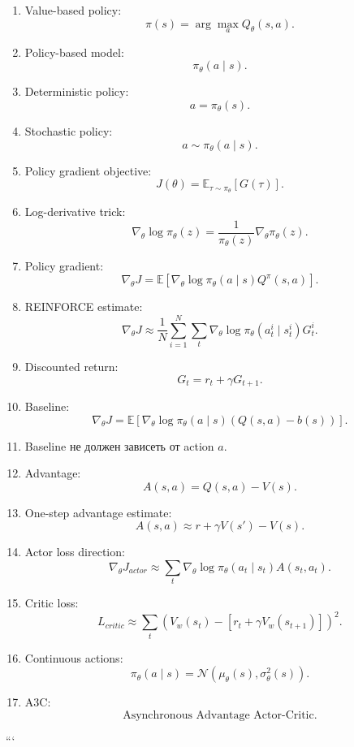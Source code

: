 \documentclass[a4paper,12pt]{article}
\begin{document}
\begin{enumerate}
    \item Value-based policy:
    \[
    \pi(s)=\arg\max_a Q_\theta(s,a).
    \]

    \item Policy-based model:
    \[
    \pi_\theta(a\mid s).
    \]

    \item Deterministic policy:
    \[
    a=\pi_\theta(s).
    \]

    \item Stochastic policy:
    \[
    a\sim\pi_\theta(a\mid s).
    \]

    \item Policy gradient objective:
    \[
    J(\theta)
    =
    \mathbb{E}_{\tau\sim\pi_\theta}
    [
    G(\tau)
    ].
    \]

    \item Log-derivative trick:
    \[
    \nabla_\theta\log\pi_\theta(z)
    =
    \frac{1}{\pi_\theta(z)}
    \nabla_\theta\pi_\theta(z).
    \]

    \item Policy gradient:
    \[
    \nabla_\theta J
    =
    \mathbb{E}
    [
    \nabla_\theta
    \log \pi_\theta(a\mid s)
    Q^\pi(s,a)
    ].
    \]

    \item REINFORCE estimate:
    \[
    \nabla_\theta J
    \approx
    \frac{1}{N}
    \sum_{i=1}^{N}
    \sum_{t}
    \nabla_\theta
    \log \pi_\theta(a_t^i\mid s_t^i)
    G_t^i.
    \]

    \item Discounted return:
    \[
    G_t=r_t+\gamma G_{t+1}.
    \]

    \item Baseline:
    \[
    \nabla_\theta J
    =
    \mathbb{E}
    [
    \nabla_\theta
    \log \pi_\theta(a\mid s)
    (Q(s,a)-b(s))
    ].
    \]

    \item Baseline не должен зависеть от action \(a\).

    \item Advantage:
    \[
    A(s,a)=Q(s,a)-V(s).
    \]

    \item One-step advantage estimate:
    \[
    A(s,a)\approx r+\gamma V(s')-V(s).
    \]

    \item Actor loss direction:
    \[
    \nabla_\theta J_{actor}
    \approx
    \sum_t
    \nabla_\theta
    \log \pi_\theta(a_t\mid s_t)
    A(s_t,a_t).
    \]

    \item Critic loss:
    \[
    L_{critic}
    \approx
    \sum_t
    \left(
    V_w(s_t)
    -
    [
    r_t+\gamma V_w(s_{t+1})
    ]
    \right)^2.
    \]

    \item Continuous actions:
    \[
    \pi_\theta(a\mid s)
    =
    \mathcal{N}(\mu_\theta(s),\sigma_\theta^2(s)).
    \]

    \item A3C:
    \[
    \text{Asynchronous Advantage Actor-Critic}.
    \]
\end{enumerate}
```
\end{document}
